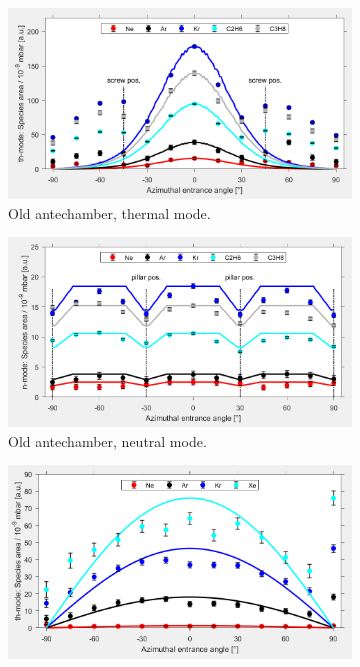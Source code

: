 	\begin{figure}[h!]
		\begin{subfigure}[t]{.5\textwidth}
			\centering
			\includegraphics[width=\textwidth]{Experiments/oldAnte_ThMode.png}
			\caption{Old antechamber, thermal mode.}
		\end{subfigure}
		\begin{subfigure}[t]{.5\textwidth}
			\centering
			\includegraphics[width=\textwidth]{Experiments/oldAnte_NMode.png}
			\caption{Old antechamber, neutral mode.}
		\end{subfigure}
		\begin{subfigure}[b]{.5\textwidth}
			\centering
			\includegraphics[width=\textwidth]{Experiments/newAnte_ThMode.png}

\end{subfigure}
\end{figure}
